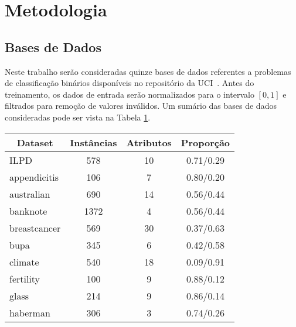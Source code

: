 \documentclass[conference]{IEEEtran}
\begin{document}
	\section{Metodologia}
	\subsection{Bases de Dados}
	Neste trabalho serão consideradas quinze bases de dados referentes a problemas de classificação binários disponíveis no repositório da UCI~\cite{dua2019}. Antes do treinamento, os dados de entrada serão normalizados para o intervalo $[0,1]$ e filtrados para remoção de valores inválidos. Um sumário das bases de dados consideradas pode ser vista na Tabela \ref{tab:datasets}.

	\begin{table}[h!]
		\centering
		\label{tab:datasets}
		\begin{tabular}{|l|c|c|c|}
			\hline
			\multicolumn{1}{|c|}{\textbf{Dataset}} & \textbf{Instâncias} & \textbf{Atributos} & \textbf{Proporção} \\ \hline
			ILPD                                   & 578                 & 10                 & 0.71/0.29          \\ \hline
			appendicitis                           & 106                 & 7                  & 0.80/0.20          \\ \hline
			australian                             & 690                 & 14                 & 0.56/0.44          \\ \hline
			banknote                               & 1372                & 4                  & 0.56/0.44          \\ \hline
			breastcancer                           & 569                 & 30                 & 0.37/0.63          \\ \hline
			bupa                                   & 345                 & 6                  & 0.42/0.58          \\ \hline
			climate                                & 540                 & 18                 & 0.09/0.91          \\ \hline
			fertility                              & 100                 & 9                  & 0.88/0.12          \\ \hline
			glass                                  & 214                 & 9                  & 0.86/0.14          \\ \hline
			haberman                               & 306                 & 3                  & 0.74/0.26          \\ \hline

\end{tabular}
\end{table}
\end{document}
